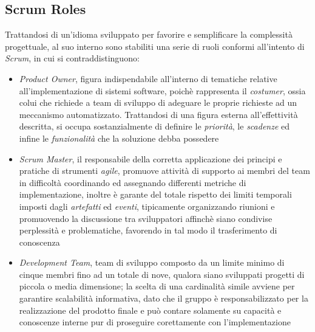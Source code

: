 \documentclass{article}
\begin{document}
\subsection*{Scrum Roles}
\large
Trattandosi di un'idioma sviluppato per favorire e semplificare la complessità progettuale, al suo interno sono stabiliti una serie di ruoli conformi all'intento di \textit{Scrum}, in cui si contraddistinguono:
\begin{itemize}[label={-}]
    \itemsep0em
    \item \textit{Product Owner}, figura indispendabile all'interno di tematiche relative all'implementazione di sistemi software, poichè rappresenta il \textit{costumer}, ossia colui che richiede a team di sviluppo di adeguare le proprie richieste ad un meccanismo automatizzato. Trattandosi di una figura esterna all'effettività descritta, si occupa sostanzialmente di definire le \textit{priorità}, le \textit{scadenze} ed infine le \textit{funzionalità} che la soluzione debba possedere
    \item \textit{Scrum Master}, il responsabile della corretta applicazione dei principi e pratiche di strumenti \textit{agile}, promuove attività di supporto ai membri del team in difficoltà coordinando ed assegnando differenti metriche di implementazione, inoltre è garante del totale rispetto dei limiti temporali imposti dagli \textit{artefatti} ed \textit{eventi}, tipicamente organizzando riunioni e promuovendo la discussione tra sviluppatori affinchè siano condivise perplessità e problematiche, favorendo in tal modo il trasferimento di conoscenza
    \item \textit{Development Team}, team di sviluppo composto da un limite minimo di cinque membri fino ad un totale di nove, qualora siano sviluppati progetti di piccola o media dimensione; la scelta di una cardinalità simile avviene per garantire scalabilità informativa, dato che il gruppo è responsabilizzato per la realizzazione del prodotto finale e può contare solamente su capacità e conoscenze interne pur di proseguire corettamente con l'implementazione
\end{itemize}
\end{document}
